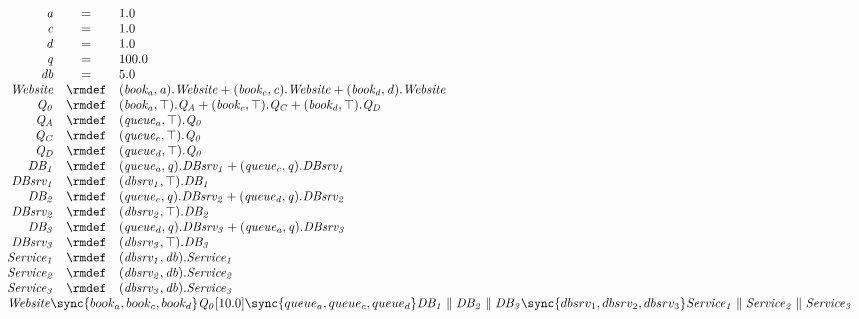 \begin{displaymath}
	\begin{array}{rcl}
		\mathit{a} & = & 1.0\\
		\mathit{c} & = & 1.0\\
		\mathit{d} & = & 1.0\\
		\mathit{q} & = & 100.0\\
		\mathit{db} & = & 5.0\\
[0.0ex]		\mathit{Website} & \rmdef & (\mathit{book_a},\mathit{a}).\mathit{Website}+(\mathit{book_c},\mathit{c}).\mathit{Website}+(\mathit{book_d},\mathit{d}).\mathit{Website}\\
		\mathit{Q_0} & \rmdef & (\mathit{book_a},\top).\mathit{Q_A}+(\mathit{book_c},\top).\mathit{Q_C}+(\mathit{book_d},\top).\mathit{Q_D}\\
		\mathit{Q_A} & \rmdef & (\mathit{queue_a},\top).\mathit{Q_0}\\
		\mathit{Q_C} & \rmdef & (\mathit{queue_c},\top).\mathit{Q_0}\\
		\mathit{Q_D} & \rmdef & (\mathit{queue_d},\top).\mathit{Q_0}\\
		\mathit{DB_1} & \rmdef & (\mathit{queue_a},\mathit{q}).\mathit{DBsrv_1}+(\mathit{queue_c},\mathit{q}).\mathit{DBsrv_1}\\
		\mathit{DBsrv_1} & \rmdef & (\mathit{dbsrv_1},\top).\mathit{DB_1}\\
		\mathit{DB_2} & \rmdef & (\mathit{queue_c},\mathit{q}).\mathit{DBsrv_2}+(\mathit{queue_d},\mathit{q}).\mathit{DBsrv_2}\\
		\mathit{DBsrv_2} & \rmdef & (\mathit{dbsrv_2},\top).\mathit{DB_2}\\
		\mathit{DB_3} & \rmdef & (\mathit{queue_d},\mathit{q}).\mathit{DBsrv_3}+(\mathit{queue_a},\mathit{q}).\mathit{DBsrv_3}\\
		\mathit{DBsrv_3} & \rmdef & (\mathit{dbsrv_3},\top).\mathit{DB_3}\\
		\mathit{Service_1} & \rmdef & (\mathit{dbsrv_1},\mathit{db}).\mathit{Service_1}\\
		\mathit{Service_2} & \rmdef & (\mathit{dbsrv_2},\mathit{db}).\mathit{Service_2}\\
		\mathit{Service_3} & \rmdef & (\mathit{dbsrv_3},\mathit{db}).\mathit{Service_3}\\
[0.0ex]		\multicolumn{3}{l}{\mathit{Website}\sync{book_a,book_c,book_d}\mathit{Q_0}[10.0]\sync{queue_a,queue_c,queue_d}\mathit{DB_1}\parallel\mathit{DB_2}\parallel\mathit{DB_3}\sync{dbsrv_1,dbsrv_2,dbsrv_3}\mathit{Service_1}\parallel\mathit{Service_2}\parallel\mathit{Service_3}}\\
[0.0ex]	\end{array}
\end{displaymath}
